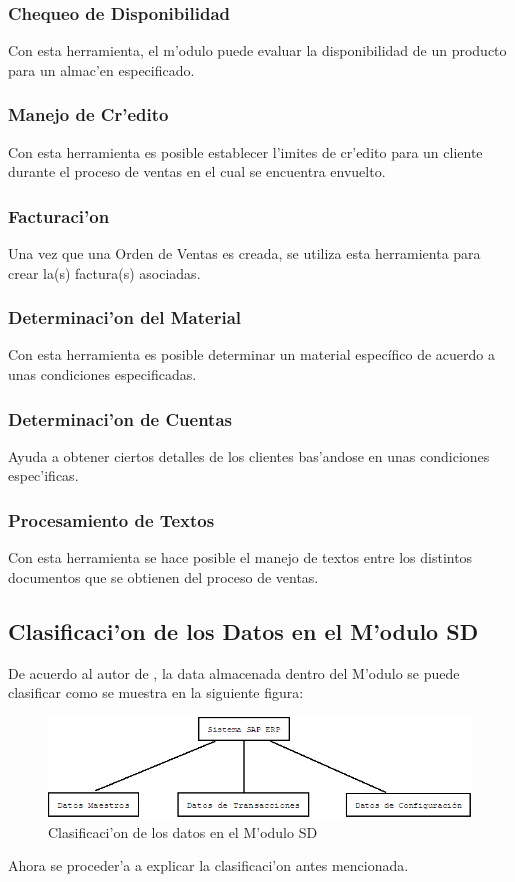 \subsubsection{Chequeo de Disponibilidad}
Con esta herramienta, el m'odulo puede evaluar la disponibilidad de un producto para un almac'en especificado.
\subsubsection{Manejo de Cr'edito}
Con esta herramienta es posible establecer l'imites de cr'edito para un cliente durante el proceso de ventas en el cual se encuentra envuelto.
\subsubsection{Facturaci'on}
Una vez que una Orden de Ventas es creada, se utiliza esta herramienta para crear la(s) factura(s) asociadas.
\subsubsection{Determinaci'on del Material}
Con esta herramienta es posible determinar un material específico de acuerdo a unas condiciones especificadas.
\subsubsection{Determinaci'on de Cuentas}
Ayuda a obtener ciertos detalles de los clientes bas'andose en unas condiciones espec'ificas.
\subsubsection{Procesamiento de Textos}
Con esta herramienta se hace posible el manejo de textos entre los distintos documentos que se obtienen del proceso de ventas.


\subsection{Clasificaci'on de los Datos en el M'odulo SD}
De acuerdo al autor de \cite{SD01}, la data almacenada dentro del M'odulo se puede clasificar como se muestra en la siguiente figura:
\begin{figure}[htb]
\centering
\includegraphics[scale=0.45,type=png,ext=.png,read=.png]{figures/Clasificacion1}
\caption{Clasificaci'on de los datos en el M'odulo SD}
\label{fig:datasd}
\end{figure}
Ahora se proceder'a a explicar la clasificaci'on antes mencionada.
